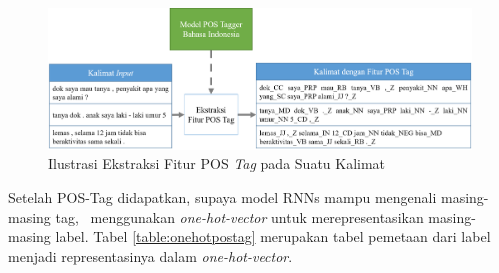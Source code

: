 \begin{enumerate}
	\begin{figure}
		\centering
		\includegraphics[width=\linewidth]{images/fiturpostag}
		\caption{Ilustrasi Ekstraksi Fitur POS \textit{Tag} pada Suatu Kalimat}
		\label{fig:fiturpostag}
	\end{figure}

	Setelah POS-Tag didapatkan, supaya model RNNs mampu mengenali masing-masing tag, \saya~menggunakan \textit{one-hot-vector} untuk merepresentasikan masing-masing label. Tabel \ref{table:onehotpostag} merupakan tabel pemetaan dari label menjadi representasinya dalam \textit{one-hot-vector}.
	

\end{enumerate}
